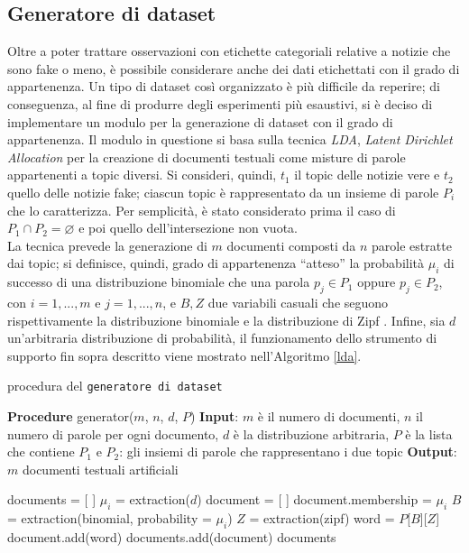 \documentclass[12pt]{report}
\theoremstyle{definition}
\let\emptyset\varnothing
\begin{document}
\subsection{Generatore di dataset}\label{generator}
Oltre a poter trattare osservazioni con etichette categoriali relative a notizie che sono fake o meno, è possibile considerare anche dei dati etichettati con il grado di appartenenza. Un tipo di dataset così organizzato è più difficile da reperire; di conseguenza, al fine di produrre degli esperimenti più esaustivi, si è deciso di implementare un modulo per la generazione di dataset con il grado di appartenenza. Il modulo in questione si basa sulla tecnica \textit{LDA}, \textit{Latent Dirichlet Allocation} \cite{20} per la creazione di documenti testuali come misture di parole appartenenti a topic diversi. 
Si consideri, quindi, $t_1$ il topic delle notizie vere e $t_2$ quello delle notizie fake; ciascun topic è rappresentato da un insieme di parole $P_i$ che lo caratterizza. Per semplicità, è stato considerato prima il caso di $P_1 \cap P_2 = \emptyset$ e poi quello dell'intersezione non vuota.
\\
La tecnica prevede la generazione di $m$ documenti composti da $n$ parole estratte dai topic; si definisce, quindi, grado di appartenenza ``atteso'' la probabilità $\mu_i$ di successo di una distribuzione binomiale che una parola $p_j \in P_1$ oppure $p_j \in P_2$, con $i=1, ..., m$ e $j=1, ..., n$, e $B, Z$ due variabili casuali che seguono rispettivamente la distribuzione binomiale e la distribuzione di Zipf \cite{34}. Infine, sia $d$ un'arbitraria distribuzione di probabilità, il funzionamento dello strumento di supporto fin sopra descritto viene mostrato nell'Algoritmo \ref{lda}.
\begin{algorithm}
\caption{procedura del \texttt{generatore di dataset}}
\label{lda}
\hspace*{\algorithmicindent} \textbf{Procedure} generator($m$, $n$, $d$, $P$)
\newline
\hspace*{\algorithmicindent} \textbf{Input}: $m$ è il numero di documenti, $n$ il numero di parole per ogni documento, $d$ è la distribuzione arbitraria, $P$ è la lista che contiene $P_1$ e $P_2$: gli insiemi di parole che rappresentano i due topic
\newline
\hspace*{\algorithmicindent} \textbf{Output}: $m$ documenti testuali artificiali
\begin{algorithmic}[1]
\STATE documents = [ ]
\STATE $\mu_i$ = extraction($d$)
\STATE document = [ ]
\STATE document.membership = $\mu_i$
\STATE $B$ = extraction(binomial, probability = $\mu_i$)
\STATE $Z$ = extraction(zipf)
\STATE word = $P$[$B$][$Z$]
\STATE document.add(word)
\ENDFOR
\STATE documents.add(document)
\ENDFOR
\RETURN documents
\end{algorithmic}
\end{algorithm}
\end{document}
